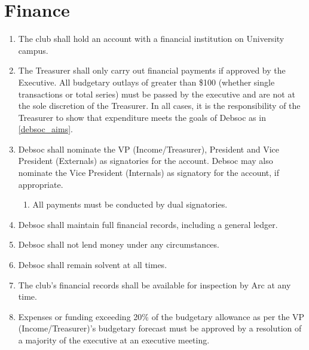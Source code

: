 \newpage
\section{Finance} \label{finances_section}

\begin{enumerate}
\item The club shall hold an account with a financial institution on University campus.
\item The Treasurer shall only carry out financial payments if approved by the Executive. All budgetary outlays of greater than \$100 (whether single transactions or total series) must be passed by the executive and are not at the sole discretion of the Treasurer. In all cases, it is the responsibility of the Treasurer to show that expenditure meets the goals of Debsoc as in \ref{debsoc_aims}.
\item Debsoc shall nominate the VP (Income/Treasurer), President and Vice President (Externals) as signatories for the account. Debsoc may also nominate the Vice President (Internals) as signatory for the account, if appropriate.
\begin{enumerate}
    \item All payments must be conducted by dual signatories.
\end{enumerate}
\item Debsoc shall maintain full financial records, including a general ledger.
\item Debsoc shall not lend money under any circumstances.
\item Debsoc shall remain solvent at all times.
\item The club’s financial records shall be available for inspection by Arc at any time.
\item Expenses or funding exceeding 20\% of the budgetary allowance as per the VP (Income/Treasurer)’s budgetary forecast must be approved by a resolution of a majority of the executive at an executive meeting.
\end{enumerate}
